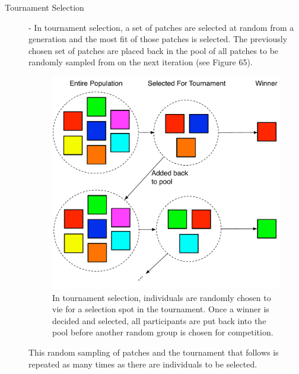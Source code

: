 \documentclass[12pt]{report} 	%
\numberwithin{figure}{chapter}
\numberwithin{table}{chapter}
\numberwithin{equation}{chapter}
\begin{document}
\begin{flushleft}
\begin{description}
\item [Tournament Selection] - In tournament selection, a set of patches are selected at random from a generation and the most fit of those patches is selected. The previously chosen set of patches are placed back in the pool of all patches to be randomly sampled from on the next iteration (see Figure 65). 
\begin{figure}[h!]
\begin{center}
\includegraphics[scale = 0.6]{TournamentSelection}
\caption[Tournament selection]{In tournament selection, individuals are randomly chosen to vie for a selection spot in the tournament. Once a winner is decided and selected, all participants are put back into the pool before another random group is chosen for competition.}
\end{center}
\vspace{6pt}
\end{figure}
This random sampling of patches and the tournament that follows is repeated as many times as there are individuals to be selected.


\end{description}
\end{flushleft}
\end{document}
